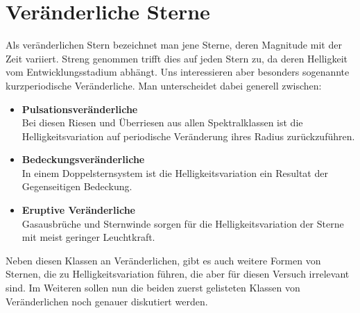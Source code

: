 \documentclass[ngerman,ruledheaders=section,class=report,thesis={type=Protokoll},accentcolor=1b,marginpar=false,parskip=half-,fontsize=11pt,]{tudapub}
\begin{document}
	
	\chapter{Veränderliche Sterne}
	Als veränderlichen Stern bezeichnet man jene Sterne, deren Magnitude mit der Zeit variiert. Streng genommen trifft dies auf jeden Stern zu, da deren Helligkeit vom Entwicklungsstadium abhängt. Uns interessieren aber besonders sogenannte kurzperiodische Veränderliche. Man unterscheidet dabei generell zwischen:
	
	\begin{itemize}
		\item \textbf{Pulsationsveränderliche}\\
		Bei diesen Riesen und Überriesen aus allen Spektralklassen ist die Helligkeitsvariation auf periodische Veränderung ihres Radius zurückzuführen.
		\item \textbf{Bedeckungsveränderliche}\\
		In einem Doppelsternsystem ist die Helligkeitsvariation ein Resultat der Gegenseitigen Bedeckung.
		\item \textbf{Eruptive Veränderliche}\\
		Gasausbrüche und Sternwinde sorgen für die Helligkeitsvariation der Sterne mit meist geringer Leuchtkraft.
	\end{itemize}
	
	Neben diesen Klassen an Veränderlichen, gibt es auch weitere Formen von Sternen, die zu Helligkeitsvariation führen, die aber für diesen Versuch irrelevant sind. Im Weiteren sollen nun die beiden zuerst gelisteten Klassen von Veränderlichen noch genauer diskutiert werden. 
	
	
\end{document}
